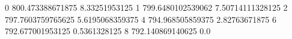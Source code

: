0 800.473388671875 8.33251953125
1 799.6480102539062 7.50714111328125
2 797.7603759765625 5.6195068359375
4 794.968505859375 2.82763671875
6 792.677001953125 0.5361328125
8 792.140869140625 0.0
